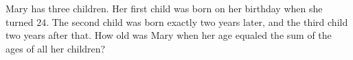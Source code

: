 Mary has three children. Her first child was born on her birthday when she turned $24$. The second child was born exactly two years later, and the third child two years after that. How old was Mary when her age equaled the sum of the ages of all her children?
